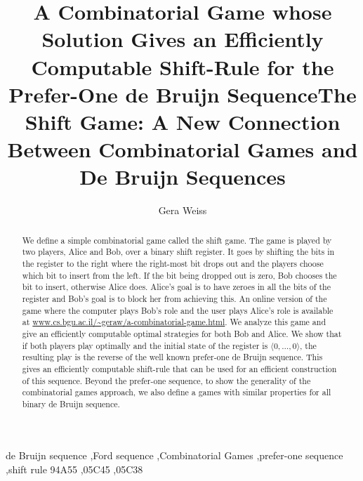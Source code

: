 \documentclass[final,12pt]{elsarticle}
\title{A Combinatorial Game whose Solution Gives an Efficiently Computable Shift-Rule for the Prefer-One de Bruijn Sequence}
\theoremstyle{definition} \newtheorem{definition}[theorem]{Definition} \newtheorem{observation}[theorem]{Observation} \newtheorem{example}[theorem]{Example} \newtheorem{remark}[theorem]{Remark} \newtheorem{corrolary}[theorem]{Corrolary}
\newcommand{\T}[1]{\langle{#1}\rangle}
\begin{document}


\sloppy
{}
\begin{frontmatter}
	
	\title{The Shift Game: A New Connection Between Combinatorial Games and De Bruijn Sequences} 
	
	
	\author{Gera Weiss}
	
	\address{Department of Computer Science, Ben-Gurion University of The Negev} 
	
	\begin{abstract}
		We define a simple combinatorial game called the shift game. The game is played by two players, Alice and Bob, over a binary shift register. It goes by shifting the bits in the register to the right where the right-most bit drops out and the players choose which bit to insert from the left. If the bit being dropped out is zero, Bob chooses the bit to insert, otherwise Alice does. Alice's goal is to have zeroes in all the bits of the register and Bob's goal is to block her from achieving this. An online version of the game where the computer plays Bob's role and the user plays Alice's role is available at \url{www.cs.bgu.ac.il/~geraw/a-combinatorial-game.html}. We analyze this game and give an efficiently computable optimal strategies for both Bob and Alice. We show that if both players play optimally and the initial state of the register is $\T{0,\dots,0}$, the resulting play is the reverse of the well known prefer-one de Bruijn sequence. This gives an efficiently computable shift-rule that can be used for an efficient construction of this sequence. Beyond the prefer-one sequence, to show the generality of the combinatorial games approach, we also define a games with similar properties for all binary de Bruijn sequence.
	\end{abstract}

	\begin{keyword}
		de Bruijn sequence \sep Ford sequence \sep Combinatorial Games \sep prefer-one sequence \sep shift rule
		\MSC[2010] 94A55 \sep 05C45 \sep 05C38
	\end{keyword}
	
\end{frontmatter}
\end{document}
